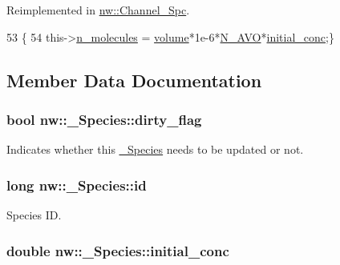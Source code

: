 Reimplemented in \hyperlink{classnw_1_1_channel___spc_af8d5d7097d343e6646c6c11a1744024d}{nw\+::\+Channel\+\_\+\+Spc}.


\begin{DoxyCode}
53                                                \{
54         this->\hyperlink{classnw_1_1___species_af6ae0232b4f994b464a2f69cb022b33f}{n\_molecules} = \hyperlink{classnw_1_1___species_a80896a55f086f468396e76ae8f1e8285}{volume}*1e-6*\hyperlink{namespacenw_ad890cfa7dd9eaf8d5b6754723e516c4a}{N\_AVO}*\hyperlink{classnw_1_1___species_ac66cdd3bdd5be88791e00d063b4e92a2}{initial\_conc};\}
\end{DoxyCode}


\subsection{Member Data Documentation}
\hypertarget{classnw_1_1___species_a79157bae3920ce7bba35e3f75b2aad6f}{
\subsubsection[{dirty\+\_\+flag}]{\setlength{\rightskip}{0pt plus 5cm}bool nw\+::\+\_\+\+Species\+::dirty\+\_\+flag\hspace{0.3cm}{\ttfamily [protected]}}}\label{classnw_1_1___species_a79157bae3920ce7bba35e3f75b2aad6f}


Indicates whether this \hyperlink{classnw_1_1___species}{\+\_\+\+Species} needs to be updated or not. 

\hypertarget{classnw_1_1___species_ac42dfe1c656c17178a9649093519ebb7}{
\subsubsection[{id}]{\setlength{\rightskip}{0pt plus 5cm}long nw\+::\+\_\+\+Species\+::id\hspace{0.3cm}{\ttfamily [protected]}}}\label{classnw_1_1___species_ac42dfe1c656c17178a9649093519ebb7}


Species I\+D. 

\hypertarget{classnw_1_1___species_ac66cdd3bdd5be88791e00d063b4e92a2}{
\subsubsection[{initial\+\_\+conc}]{\setlength{\rightskip}{0pt plus 5cm}double nw\+::\+\_\+\+Species\+::initial\+\_\+conc\hspace{0.3cm}{\ttfamily [protected]}}}\label{classnw_1_1___species_ac66cdd3bdd5be88791e00d063b4e92a2}


